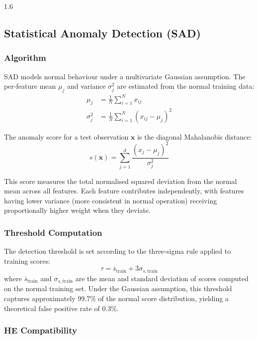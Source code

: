 \begin{spacing}{1.6}
\subsection{Statistical Anomaly Detection (SAD)}

\subsubsection{Algorithm}

SAD models normal behaviour under a multivariate Gaussian assumption. The
per-feature mean $\mu_j$ and variance $\sigma_j^2$ are estimated from the
normal training data:
\begin{align}
  \mu_j &= \frac{1}{N} \sum_{i=1}^N x_{ij} \\
  \sigma_j^2 &= \frac{1}{N} \sum_{i=1}^N (x_{ij} - \mu_j)^2
\end{align}

The anomaly score for a test observation $\mathbf{x}$ is the diagonal
Mahalanobis distance:
\begin{equation}
  s(\mathbf{x}) = \sum_{j=1}^d \frac{(x_j - \mu_j)^2}{\sigma_j^2}
  \label{eq:sad}
\end{equation}

This score measures the total normalised squared deviation from the normal
mean across all features. Each feature contributes independently, with
features having lower variance (more consistent in normal operation) receiving
proportionally higher weight when they deviate.

\subsubsection{Threshold Computation}

The detection threshold is set according to the three-sigma rule applied to
training scores:
\begin{equation}
  \tau = \bar{s}_\text{train} + 3 \sigma_{s,\text{train}}
\end{equation}
where $\bar{s}_\text{train}$ and $\sigma_{s,\text{train}}$ are the mean and
standard deviation of scores computed on the normal training set. Under the
Gaussian assumption, this threshold captures approximately 99.7\% of the normal
score distribution, yielding a theoretical false positive rate of 0.3\%.

\subsubsection{HE Compatibility}


\end{spacing}
